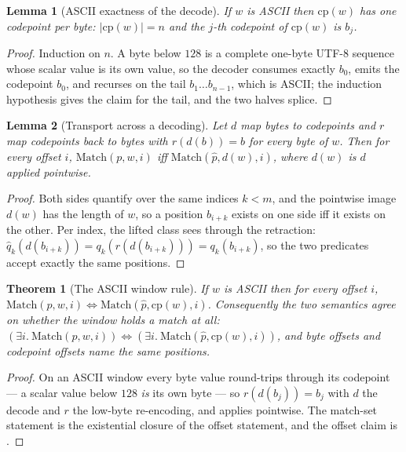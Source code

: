 \documentclass[11pt,letterpaper]{article}
\newtheorem{theorem}{Theorem}
\newtheorem{lemma}{Lemma}
\begin{document}
\begin{lemma}[ASCII exactness of the decode]
\label{lem:ascii-exact}
If $w$ is ASCII then $\mathrm{cp}(w)$ has one codepoint per byte:
$\lvert\mathrm{cp}(w)\rvert=n$ and the $j$-th codepoint of
$\mathrm{cp}(w)$ is $b_j$.
\end{lemma}

\begin{proof}
Induction on $n$. A byte below $128$ is a complete one-byte UTF-8
sequence whose scalar value is its own value, so the decoder consumes
exactly $b_0$, emits the codepoint $b_0$, and recurses on the tail
$b_1\dots b_{n-1}$, which is ASCII; the induction hypothesis gives the
claim for the tail, and the two halves splice.
\end{proof}

\begin{lemma}[Transport across a decoding]
\label{lem:transport}
Let $d$ map bytes to codepoints and $r$ map codepoints back to bytes with
$r(d(b))=b$ for every byte of $w$. Then for every offset $i$,
$\mathrm{Match}(p,w,i)$ iff $\mathrm{Match}(\hat p,d(w),i)$, where $d(w)$
is $d$ applied pointwise.
\end{lemma}

\begin{proof}
Both sides quantify over the same indices $k<m$, and the pointwise image
$d(w)$ has the length of $w$, so a position $b_{i+k}$ exists on one side
iff it exists on the other. Per index, the lifted class sees through the
retraction:
$\hat q_k(d(b_{i+k}))=q_k(r(d(b_{i+k})))=q_k(b_{i+k})$,
so the two predicates accept exactly the same positions.
\end{proof}

\begin{theorem}[The ASCII window rule]
\label{thm:window}
If $w$ is ASCII then for every offset $i$,
$\mathrm{Match}(p,w,i)\iff\mathrm{Match}(\hat p,\mathrm{cp}(w),i)$.
Consequently the two semantics agree on whether the window holds a match
at all:
$(\exists i.\ \mathrm{Match}(p,w,i))\iff
(\exists i.\ \mathrm{Match}(\hat p,\mathrm{cp}(w),i))$, and byte offsets
and codepoint offsets name the same positions.
\end{theorem}

\begin{proof}
On an ASCII window every byte value round-trips through its codepoint ---
a scalar value below $128$ \emph{is} its own byte --- so
$r(d(b_j))=b_j$ with $d$ the decode and $r$ the low-byte re-encoding, and
 applies pointwise. The match-set statement is the
existential closure of the offset statement, and the offset claim is
.
\end{proof}
\end{document}
